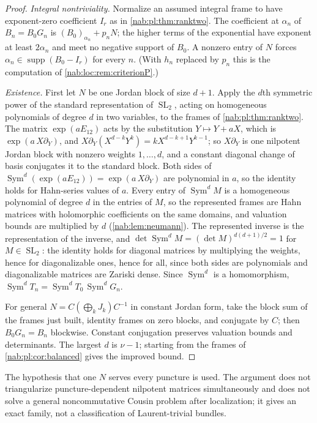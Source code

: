 \documentclass[11pt,letterpaper]{article}
\theoremstyle{definition}
\theoremstyle{remark}
\newcommand{\SL}{\operatorname{SL}}
\newcommand{\supp}{\operatorname{supp}}
\newcommand{\Sym}{\operatorname{Sym}}
\numberwithin{equation}{section}
\begin{document}
\begin{proof}
\emph{Integral nontriviality.} Normalize an assumed integral frame to have
exponent-zero coefficient $I_r$ as in \cref{nab:pl:thm:ranktwo}. The
coefficient at $\alpha_n$ of $B_n=B_0G_n$ is $(B_0)_{\alpha_n}+p_nN$; the
higher terms of the exponential have exponent at least $2\alpha_n$ and meet no
negative support of $B_0$. A nonzero entry of $N$ forces
$\alpha_n\in\supp(B_0-I_r)$ for every $n$. (With $h_n$ replaced by $p_n$ this
is the computation of \cref{nab:loc:rem:criterionP}.)

\emph{Existence.} First let $N$ be one Jordan block of size $d+1$. Apply the
$d$th symmetric power of the standard representation of $\SL_2$, acting on
homogeneous polynomials of degree $d$ in two variables, to the frames of
\cref{nab:pl:thm:ranktwo}. The matrix $\exp(aE_{12})$ acts by the substitution
$Y\mapsto Y+aX$, which is $\exp(a\,X\partial_Y)$, and
$X\partial_Y(X^{d-k}Y^k)=kX^{d-k+1}Y^{k-1}$; so $X\partial_Y$ is one nilpotent
Jordan block with nonzero weights $1,\ldots,d$, and a constant diagonal change
of basis conjugates it to the standard block. Both sides of
$\Sym^d(\exp(aE_{12}))=\exp(a\,X\partial_Y)$ are polynomial in $a$, so the
identity holds for Hahn-series values of $a$. Every entry of $\Sym^dM$ is a
homogeneous polynomial of degree $d$ in the entries of $M$, so the represented
frames are Hahn matrices with holomorphic coefficients on the same domains, and
valuation bounds are multiplied by $d$ (\cref{nab:lem:neumann}). The
represented inverse is the representation of the inverse, and
$\det\Sym^dM=(\det M)^{d(d+1)/2}=1$ for $M\in\SL_2$: the identity holds for
diagonal matrices by multiplying the weights, hence for diagonalizable ones,
hence for all, since both sides are polynomials and diagonalizable matrices are
Zariski dense. Since $\Sym^d$ is a homomorphism, $\Sym^dT_n=\Sym^dT_0\,\Sym^dG_n$.

For general $N=C(\bigoplus_kJ_k)C^{-1}$ in constant Jordan form, take the block
sum of the frames just built, identity frames on zero blocks, and conjugate by
$C$; then $B_0G_n=B_n$ blockwise. Constant conjugation preserves valuation
bounds and determinants. The largest $d$ is $\nu-1$; starting from the frames
of \cref{nab:pl:cor:balanced} gives the improved bound.
\end{proof}

The hypothesis that one $N$ serves every puncture is used. The argument does
not triangularize puncture-dependent nilpotent matrices simultaneously and does
not solve a general noncommutative Cousin problem after localization; it gives
an exact family, not a classification of Laurent-trivial bundles.
\end{document}
